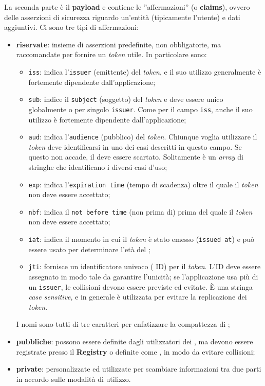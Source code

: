 La seconda parte è il \textbf{payload} e contiene le ''affermazioni'' (o \textbf{claims}), ovvero delle asserzioni di sicurezza riguardo un'entità (tipicamente l'utente) e dati aggiuntivi. Ci sono tre tipi di affermazioni:
\begin{itemize}
\item \textbf{riservate}: insieme di asserzioni predefinite, non obbligatorie, ma raccomandate per fornire un \textit{token} utile. In particolare sono:
	\begin{itemize}
	\item \texttt{iss}: indica l'\texttt{issuer} (emittente) del \textit{token}, e il suo utilizzo generalmente è fortemente dipendente dall'applicazione;
	\item \texttt{sub}: indice il \texttt{subject} (soggetto) del \textit{token} e deve essere unico globalmente o per singolo \texttt{issuer}. Come per il campo \texttt{iss}, anche il suo utilizzo è  fortemente dipendente dall'applicazione;
	\item \texttt{aud}: indica l'\texttt{audience} (pubblico) del \textit{token}. Chiunque voglia utilizzare il \textit{token} deve identificarsi in uno dei casi descritti in questo campo. Se questo non accade, il  deve essere scartato. Solitamente è un \textit{array} di stringhe che identificano i diversi casi d'uso;
	\item \texttt{exp}: indica l'\texttt{expiration time} (tempo di scadenza) oltre il quale il \textit{token} non deve essere accettato;
	\item \texttt{nbf}: indica il \texttt{not before time} (non prima di) prima del quale il \textit{token} non deve essere accettato;
	\item \texttt{iat}: indica il momento in cui il \textit{token} è stato emesso (\texttt{issued at}) e può essere usato per determinare l'età del ;
	\item \texttt{jti}: fornisce un identificatore univoco ( ID) per il \textit{token}. L'ID deve essere assegnato in modo tale da garantire l'unicità; se l'applicazione usa più di un \texttt{issuer}, le collisioni devono essere previste ed evitate. È una stringa \textit{case sensitive}, e in generale è utilizzata per evitare la replicazione dei \textit{token}.
	\end{itemize}
I nomi sono tutti di tre caratteri per enfatizzare la compattezza di ;
\item \textbf{pubbliche}: possono essere definite dagli utilizzatori dei , ma devono essere registrate presso il \textbf{  Registry} o definite come , in modo da evitare collisioni;
\item \textbf{private}: personalizzate ed utilizzate per scambiare informazioni tra due parti in accordo sulle modalità di utilizzo.
\end{itemize}
